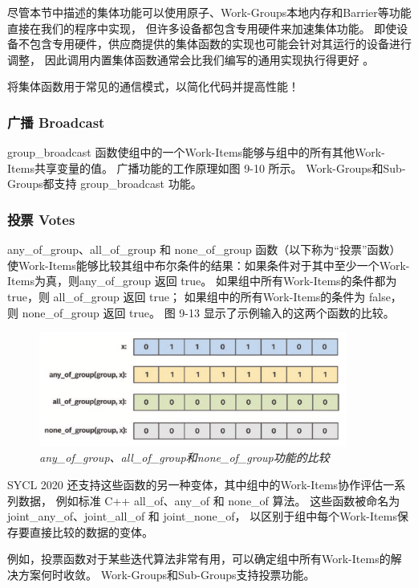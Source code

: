 尽管本节中描述的集体功能可以使用原子、Work-Groups本地内存和Barrier等功能直接在我们的程序中实现，
但许多设备都包含专用硬件来加速集体功能。 
即使设备不包含专用硬件，供应商提供的集体函数的实现也可能会针对其运行的设备进行调整，
因此调用内置集体函数通常会比我们编写的通用实现执行得更好 。

\begin{remark}
	将集体函数用于常见的通信模式，以简化代码并提高性能！
\end{remark}

\subsubsection{广播 Broadcast}
group\_broadcast 函数使组中的一个Work-Items能够与组中的所有其他Work-Items共享变量的值。 
广播功能的工作原理如图 9-10 所示。 Work-Groups和Sub-Groups都支持 group\_broadcast 功能。

\subsubsection{投票 Votes}
any\_of\_group、all\_of\_group 和 none\_of\_group 函数（以下称为“投票”函数）
使Work-Items能够比较其组中布尔条件的结果：如果条件对于其中至少一个Work-Items为真，则any\_of\_group 返回 true。 
如果组中所有Work-Items的条件都为 true，则 all\_of\_group 返回 true；
如果组中的所有Work-Items的条件为 false，则 none\_of\_group 返回 true。 
图 9-13 显示了示例输入的这两个函数的比较。

\begin{figure}[H]
	\centering
	\includegraphics[width=0.9\textwidth]{figs/F9.13.png}
	\caption{\textit{any\_of\_group、all\_of\_group和none\_of\_group功能的比较 }}
\end{figure}

SYCL 2020 还支持这些函数的另一种变体，其中组中的Work-Items协作评估一系列数据，
例如标准 C++ all\_of、any\_of 和 none\_of 算法。 
这些函数被命名为 joint\_any\_of、joint\_all\_of 和 joint\_none\_of，
以区别于组中每个Work-Items保存要直接比较的数据的变体。

例如，投票函数对于某些迭代算法非常有用，可以确定组中所有Work-Items的解决方案何时收敛。 
Work-Groups和Sub-Groups支持投票功能。

